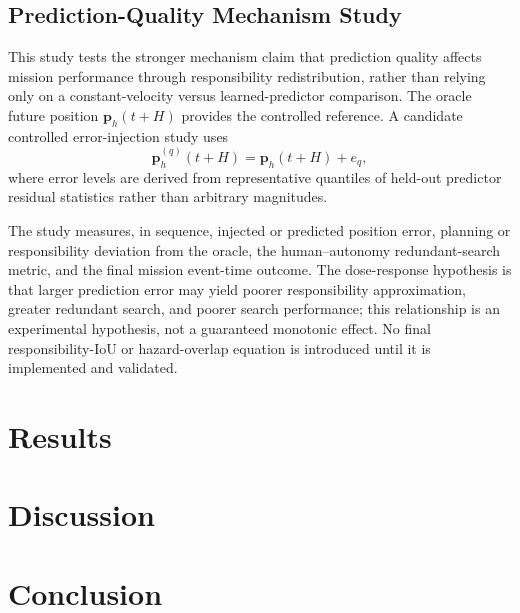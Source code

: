 \documentclass[letterpaper, 10pt, conference]{ieeeconf}
\begin{document}
\subsection{Prediction-Quality Mechanism Study}

This study tests the stronger mechanism claim that prediction quality affects mission performance through responsibility redistribution, rather than relying only on a constant-velocity versus learned-predictor comparison. The oracle future position \(\mathbf{p}_h(t+H)\) provides the controlled reference. A candidate controlled error-injection study uses
\begin{equation}
  \hat{\mathbf{p}}_h^{(q)}(t+H) = \mathbf{p}_h(t+H) + e_q,
  \label{eq:prediction_error_injection}
\end{equation}
where error levels are derived from representative quantiles of held-out predictor residual statistics rather than arbitrary magnitudes.

The study measures, in sequence, injected or predicted position error, planning or responsibility deviation from the oracle, the human--autonomy redundant-search metric, and the final mission event-time outcome. The dose-response hypothesis is that larger prediction error may yield poorer responsibility approximation, greater redundant search, and poorer search performance; this relationship is an experimental hypothesis, not a guaranteed monotonic effect. No final responsibility-IoU or hazard-overlap equation is introduced until it is implemented and validated.

\section{Results}

\section{Discussion}

\section{Conclusion}
\end{document}

